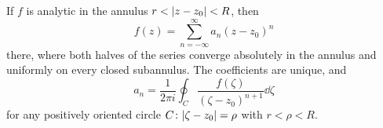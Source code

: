 \begin{theorem}\label{thm:laurent}
  If $f$ is analytic in the annulus $r < \lvert z - z_0\rvert < R$, then
  \[
    f(z) = \sum_{n=-\infty}^{\infty} a_n (z - z_0)^n
  \]
  there, where both halves of the series converge absolutely in the annulus
  and uniformly on every closed subannulus. The coefficients are unique, and
  \[
    a_n = \frac{1}{2\pi i} \oint_C \frac{f(\zeta)}{(\zeta - z_0)^{n+1}} \dd \zeta
  \]
  for any positively oriented circle $C \colon \lvert\zeta - z_0\rvert = \rho$ with
  $r < \rho < R$.
\end{theorem}
